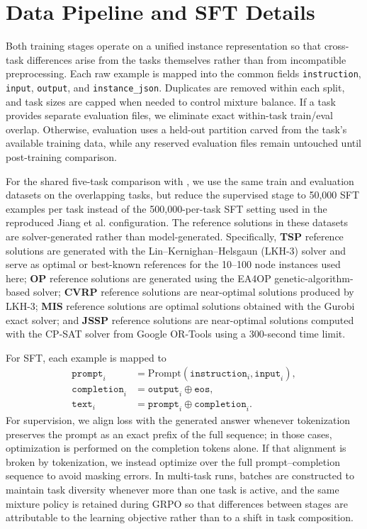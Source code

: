 \documentclass{article}
\theoremstyle{remark}
\begin{document}
\FloatBarrier
\clearpage



\clearpage
\appendix

\section{Data Pipeline and SFT Details}
\label{app:dataflow}
Both training stages operate on a unified instance representation so that cross-task differences arise from the tasks themselves rather than from incompatible preprocessing. Each raw example is mapped into the common fields \texttt{instruction}, \texttt{input}, \texttt{output}, and \texttt{instance\_json}. Duplicates are removed within each split, and task sizes are capped when needed to control mixture balance. If a task provides separate evaluation files, we eliminate exact within-task train/eval overlap. Otherwise, evaluation uses a held-out partition carved from the task's available training data, while any reserved evaluation files remain untouched until post-training comparison.

For the shared five-task comparison with \citet{jiang2025endtoendco}, we use the same train and evaluation datasets on the overlapping tasks, but reduce the supervised stage to 50{,}000 SFT examples per task instead of the 500{,}000-per-task SFT setting used in the reproduced Jiang et al. configuration. The reference solutions in these datasets are solver-generated rather than model-generated. Specifically, \textbf{TSP} reference solutions are generated with the Lin--Kernighan--Helsgaun (LKH-3) solver and serve as optimal or best-known references for the 10--100 node instances used here; \textbf{OP} reference solutions are generated using the EA4OP genetic-algorithm-based solver; \textbf{CVRP} reference solutions are near-optimal solutions produced by LKH-3; \textbf{MIS} reference solutions are optimal solutions obtained with the Gurobi exact solver; and \textbf{JSSP} reference solutions are near-optimal solutions computed with the CP-SAT solver from Google OR-Tools using a 300-second time limit.

For SFT, each example is mapped to
\begin{align}
\texttt{prompt}_i &= \mathrm{Prompt}(\texttt{instruction}_i, \texttt{input}_i), \\
\texttt{completion}_i &= \texttt{output}_i \oplus \texttt{eos}, \\
\texttt{text}_i &= \texttt{prompt}_i \oplus \texttt{completion}_i.
\end{align}
For supervision, we align loss with the generated answer whenever tokenization preserves the prompt as an exact prefix of the full sequence; in those cases, optimization is performed on the completion tokens alone. If that alignment is broken by tokenization, we instead optimize over the full prompt--completion sequence to avoid masking errors. In multi-task runs, batches are constructed to maintain task diversity whenever more than one task is active, and the same mixture policy is retained during GRPO so that differences between stages are attributable to the learning objective rather than to a shift in task composition.
\end{document}
